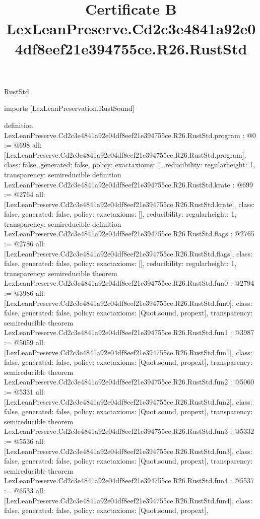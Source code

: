 \begin{lexlean}{RustStd}
\title{Certificate B LexLeanPreserve.Cd2c3e4841a92e04df8eef21e394755ce.R26.RustStd}
\begin{coremodule}
imports [LexLeanPreservation.RustSound]

definition LexLeanPreserve.Cd2c3e4841a92e04df8eef21e394755ce.R26.RustStd.program : @0 := @698 {
  all: [LexLeanPreserve.Cd2c3e4841a92e04df8eef21e394755ce.R26.RustStd.program],
  class: false,
  generated: false,
  policy: exact{axioms: []},
  reducibility: regular{height: 1},
  transparency: semireducible
}
definition LexLeanPreserve.Cd2c3e4841a92e04df8eef21e394755ce.R26.RustStd.krate : @699 := @2764 {
  all: [LexLeanPreserve.Cd2c3e4841a92e04df8eef21e394755ce.R26.RustStd.krate],
  class: false,
  generated: false,
  policy: exact{axioms: []},
  reducibility: regular{height: 1},
  transparency: semireducible
}
definition LexLeanPreserve.Cd2c3e4841a92e04df8eef21e394755ce.R26.RustStd.flags : @2765 := @2786 {
  all: [LexLeanPreserve.Cd2c3e4841a92e04df8eef21e394755ce.R26.RustStd.flags],
  class: false,
  generated: false,
  policy: exact{axioms: []},
  reducibility: regular{height: 1},
  transparency: semireducible
}
theorem LexLeanPreserve.Cd2c3e4841a92e04df8eef21e394755ce.R26.RustStd.fun0 : @2794 := @3986 {
  all: [LexLeanPreserve.Cd2c3e4841a92e04df8eef21e394755ce.R26.RustStd.fun0],
  class: false,
  generated: false,
  policy: exact{axioms: [Quot.sound, propext]},
  transparency: semireducible
}
theorem LexLeanPreserve.Cd2c3e4841a92e04df8eef21e394755ce.R26.RustStd.fun1 : @3987 := @5059 {
  all: [LexLeanPreserve.Cd2c3e4841a92e04df8eef21e394755ce.R26.RustStd.fun1],
  class: false,
  generated: false,
  policy: exact{axioms: [Quot.sound, propext]},
  transparency: semireducible
}
theorem LexLeanPreserve.Cd2c3e4841a92e04df8eef21e394755ce.R26.RustStd.fun2 : @5060 := @5331 {
  all: [LexLeanPreserve.Cd2c3e4841a92e04df8eef21e394755ce.R26.RustStd.fun2],
  class: false,
  generated: false,
  policy: exact{axioms: [Quot.sound, propext]},
  transparency: semireducible
}
theorem LexLeanPreserve.Cd2c3e4841a92e04df8eef21e394755ce.R26.RustStd.fun3 : @5332 := @5536 {
  all: [LexLeanPreserve.Cd2c3e4841a92e04df8eef21e394755ce.R26.RustStd.fun3],
  class: false,
  generated: false,
  policy: exact{axioms: [Quot.sound, propext]},
  transparency: semireducible
}
theorem LexLeanPreserve.Cd2c3e4841a92e04df8eef21e394755ce.R26.RustStd.fun4 : @5537 := @6533 {
  all: [LexLeanPreserve.Cd2c3e4841a92e04df8eef21e394755ce.R26.RustStd.fun4],
  class: false,
  generated: false,
  policy: exact{axioms: [Quot.sound, propext]},
}
\end{coremodule}
\end{lexlean}
